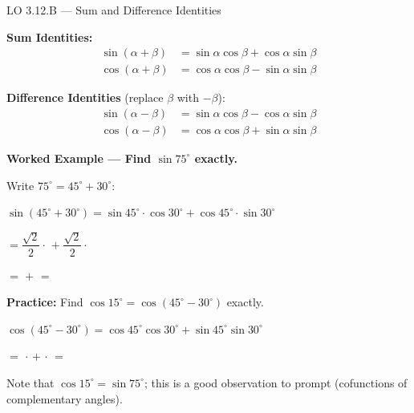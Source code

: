 \documentclass[10pt]{article}
\begin{document}
\vspace{0.08in}

\begin{notesbox}{LO 3.12.B --- Sum and Difference Identities}

\textbf{Sum Identities:}
\begin{align*}
\sin(\alpha + \beta) &= \sin\alpha\cos\beta + \cos\alpha\sin\beta \\
\cos(\alpha + \beta) &= \cos\alpha\cos\beta - \sin\alpha\sin\beta
\end{align*}

\textbf{Difference Identities} (replace $\beta$ with $-\beta$):
\begin{align*}
\sin(\alpha - \beta) &= \sin\alpha\cos\beta - \cos\alpha\sin\beta \\
\cos(\alpha - \beta) &= \cos\alpha\cos\beta + \sin\alpha\sin\beta
\end{align*}

\vspace{4pt}
\textbf{Worked Example --- Find $\sin 75^\circ$ exactly.}

Write $75^\circ = 45^\circ + 30^\circ$:

\vspace{4pt}
$\sin(45^\circ + 30^\circ)
= \sin 45^\circ \cdot \cos 30^\circ + \cos 45^\circ \cdot \sin 30^\circ$

\vspace{4pt}
$= \dfrac{\sqrt{2}}{2}\cdot$ 
$+\; \dfrac{\sqrt{2}}{2}\cdot$ 

\vspace{4pt}
$= $  $+$  $= $ 

\vspace{8pt}
\textbf{Practice:} Find $\cos 15^\circ = \cos(45^\circ - 30^\circ)$ exactly.

\vspace{4pt}
$\cos(45^\circ - 30^\circ)
= \cos 45^\circ \cos 30^\circ + \sin 45^\circ \sin 30^\circ$

\vspace{4pt}
$=$  $\cdot$ 
$+$  $\cdot$ 
$= $ 

\begin{teachernote}
Note that $\cos 15^\circ = \sin 75^\circ$; this is a good observation to prompt
(cofunctions of complementary angles).
\end{teachernote}

\end{notesbox}
\end{document}
